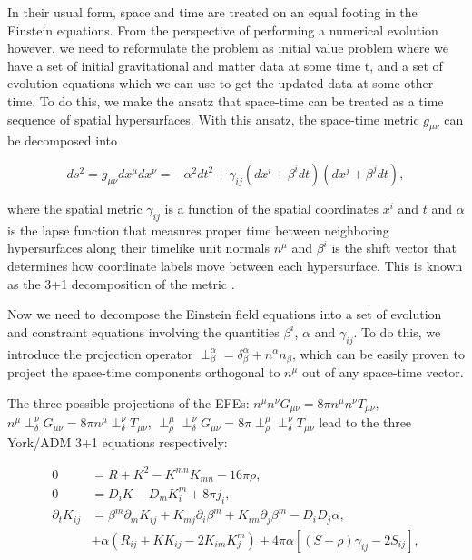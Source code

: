 \documentclass{ut-thesis}
\begin{document}
In their usual form, space and time are treated on an equal footing in the Einstein equations. From the perspective of performing a numerical evolution however, we need to reformulate the problem as initial value problem where we have a set of initial gravitational and matter data at some time t, and a set of evolution equations which we can use to get the updated data at some other time. To do this, we make the ansatz that space-time can be treated as a time sequence of spatial hypersurfaces. With this ansatz, the space-time metric $g_{\mu\nu}$ can be decomposed into

\begin{equation}
\label{eq:4}
ds^{2} = g_{\mu\nu}dx^{\mu}dx^{\nu} = -\alpha^2dt^2 + \gamma_{ij}(dx^i+\beta^idt)(dx^j+\beta^jdt),
\end{equation}

where the spatial metric $\gamma_{ij}$ is a function of the spatial coordinates $x^{i}$ and $t$ and $\alpha$ is the lapse function that measures proper time between neighboring hypersurfaces along their timelike unit normals $n^{\mu}$ and $\beta^i$ is the shift vector that determines how coordinate labels move between each hypersurface. This is known as the 3+1 decomposition of the metric \cite{arnowitt2008republication}.

Now we need to decompose the Einstein field equations into a set of evolution and constraint equations involving the quantities $\beta^i$, $\alpha$ and $\gamma_{ij}$. To do this, we introduce the projection operator $\perp^{\alpha}_{\beta} = \delta^{\alpha}_{\beta} + n^{\alpha} n_{\beta}$, which can be easily proven to project the space-time components orthogonal to $n^{\mu}$ out of any space-time vector.

The three possible projections of the EFEs: $n^{\mu} n^{\nu} G_{\mu\nu} = 8\pi n^{\mu} n^{\nu} T_{\mu\nu}$, $n^{\mu}\perp^{\nu}_{\delta}G_{\mu\nu} = 8\pi n^{\mu} \perp^{\nu}_{\delta} T_{\mu\nu}$, $\perp^{\mu}_{\rho} \perp^{\nu}_{\delta} G_{\mu\nu} = 8\pi \perp^{\mu}_{\rho} \perp^{\nu}_{\delta} T_{\mu\nu}$ lead to the three York/ADM 3+1 equations respectively:

\begin{equation}
\label{eq:5}
\begin{split}
0 &= R + K^{2} - K^{mn}K_{mn} -16\pi\rho, \\
0 &= D_iK - D_mK^m_i + 8\pi j_i, \\
\partial_t K_{ij} &= \beta^m\partial_mK_{ij} + K_{mj}\partial_i\beta^m + K_{im}\partial_j\beta^m - D_iD_j\alpha, \\ 
&+ \alpha(R_{ij}+KK_{ij}-2K_{im}K^m_{j})+4\pi\alpha[(S-\rho)\gamma_{ij}-2S_{ij}],
\end{split} 
\end{equation}
\end{document}
